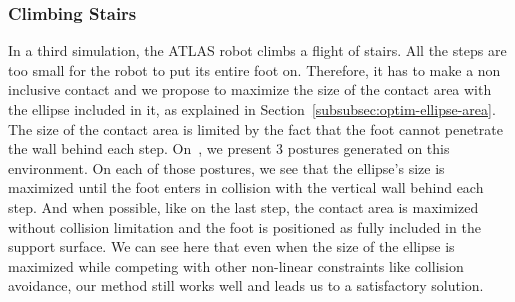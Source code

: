 %

\subsubsection{Climbing Stairs}
\label{subsubsec:smallStairs}

In a third simulation, the ATLAS robot climbs a flight of stairs.
All the steps are too small for the robot to put its entire foot on.
Therefore, it has to make a non inclusive contact and we propose to maximize the size of the contact area with the ellipse included in it, as explained in Section~\ref{subsubsec:optim-ellipse-area}.
The size of the contact area is limited by the fact that the foot cannot penetrate the wall behind each step.
On~, we present 3 postures generated on this environment.
On each of those postures, we see that the ellipse's size is maximized until the foot enters in collision with the vertical wall behind each step.
And when possible, like on the last step, the contact area is maximized without collision limitation and the foot is positioned as fully included in the support surface.
We can see here that even when the size of the ellipse is maximized while competing with other non-linear constraints like collision avoidance, our method still works well and leads us to a satisfactory solution.


